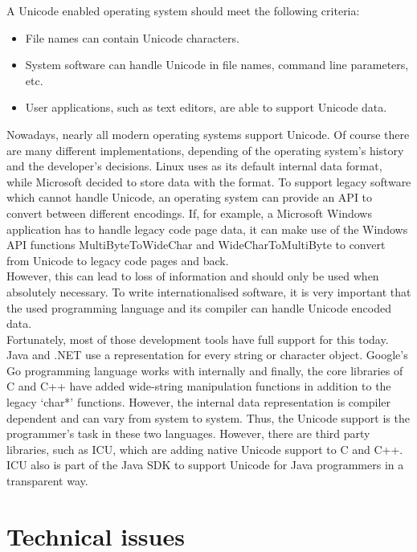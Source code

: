 \documentclass[a4paper, 12pt]{scrartcl} %
\begin{document}
A Unicode enabled operating system should meet the following
criteria:
\begin{itemize}
  \item File names can contain Unicode characters.
  \item System software can handle Unicode in file names, command line
    parameters, etc.
  \item User applications, such as text editors, are able to support Unicode
    data.
\end{itemize}
Nowadays, nearly all modern operating systems support Unicode. Of course
there are many different implementations, depending of the operating system's
history and the developer's decisions. Linux uses  as its
default internal data format, while Microsoft decided to store data with the
 format.\cite{unicodeinlinux} To support legacy software
which cannot handle Unicode, an operating system can provide an \gls{API} to convert
between different encodings. If, for example, a Microsoft Windows application
has to handle legacy code page data, it can make use of the Windows API
functions MultiByteToWideChar \cite{multibytetowidechar} and
WideCharToMultiByte \cite{widechartomultibyte} to convert from Unicode to
legacy code pages and back. \\
However, this can lead to loss of information and should only be used when
absolutely necessary. \cite{codepages} To write internationalised software, it
is very important that the used programming language and its compiler can
handle Unicode encoded data. \\
Fortunately, most of those development tools have full support for this today.
Java and .NET use a  representation for every string or
character object. Google's Go programming language works with
 internally and finally, the core libraries of C
and C++ have added wide-string manipulation functions in addition to the legacy
`char*' functions. However, the internal data representation is compiler
dependent and can vary from system to system. Thus, the Unicode support is the
programmer's task in these two languages. \cite{unicodeproglang} However, there
are third party libraries, such as \gls{ICU}, which are adding native Unicode
support to C and C++.  \gls{ICU} also is part of the Java \gls{SDK} to support
Unicode for Java programmers in a transparent way. \cite{icu}

\section{Technical issues}
\end{document}
